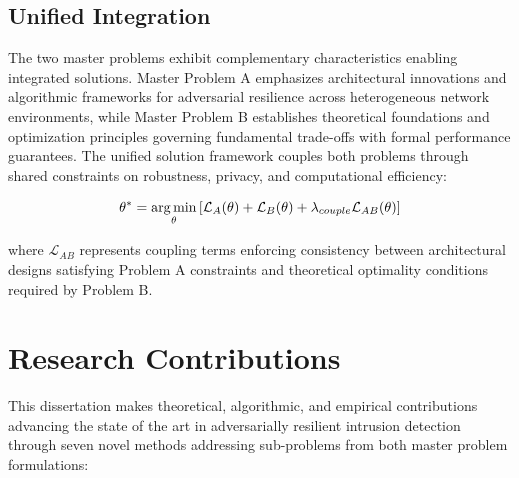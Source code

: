 \subsection*{Unified Integration}

The two master problems exhibit complementary characteristics enabling integrated solutions. Master Problem A emphasizes architectural innovations and algorithmic frameworks for adversarial resilience across heterogeneous network environments, while Master Problem B establishes theoretical foundations and optimization principles governing fundamental trade-offs with formal performance guarantees. The unified solution framework couples both problems through shared constraints on robustness, privacy, and computational efficiency:

\begin{equation}
\theta^* = \operatorname*{arg\,min}_\theta \left[ \mathcal{L}_A(\theta) + \mathcal{L}_B(\theta) + \lambda_{couple} \mathcal{L}_{AB}(\theta) \right]
\end{equation}

where $\mathcal{L}_{AB}$ represents coupling terms enforcing consistency between architectural designs satisfying Problem A constraints and theoretical optimality conditions required by Problem B.




\section*{Research Contributions}

This dissertation makes theoretical, algorithmic, and empirical contributions advancing the state of the art in adversarially resilient intrusion detection through seven novel methods addressing sub-problems from both master problem formulations:

